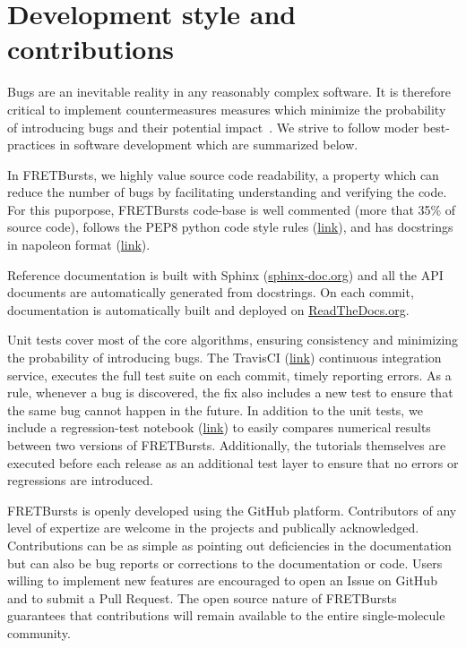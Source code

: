 \section{Development style and contributions}

Bugs are an inevitable reality in any reasonably complex software. It is 
therefore critical to implement countermeasures measures which
minimize the probability of introducing bugs and their potential impact~\cite{Prli__2012, Wilson_2014}.
We strive to follow moder best-practices in software development which are summarized 
below.

In FRETBursts, we highly value source code readability, a property which can 
reduce the number of bugs by facilitating understanding and verifying the code.
For this puporpose, FRETBursts code-base is well commented (more that 35\%
of source code), 
follows the PEP8 python code style rules (\href{https://www.python.org/dev/peps/pep-0008/}{link}),
and has docstrings in napoleon format (\href{http://sphinxcontrib-napoleon.readthedocs.org/}{link}).

Reference documentation is built with Sphinx (\href{http://sphinx-doc.org/}{sphinx-doc.org})
and all the API documents are automatically generated from docstrings.
On each commit, documentation is automatically built and deployed on
\href{https://readthedocs.org/}{ReadTheDocs.org}.

Unit tests cover most of the core algorithms, ensuring consistency and
minimizing the probability of introducing bugs. 
The TravisCI (\href{http://travis-ci.org}{link}) continuous integration service, 
executes the full test suite on each commit, timely reporting errors.
As a rule, whenever a bug is discovered, the  fix also includes a new test
to ensure that the same bug cannot happen in the future.
In addition to the unit tests, we include a regression-test notebook
(\href{https://github.com/tritemio/FRETBursts/blob/master/notebooks/dev/tests/FRETBursts\%20-\%20Regression\%20tests.ipynb}{link})
to easily compares numerical results between two versions of FRETBursts. 
Additionally, the tutorials themselves are executed before each release as
an additional test layer to ensure that no errors or regressions are introduced.

FRETBursts is openly developed using the GitHub platform.
Contributors of any level of expertize are welcome in the projects
and publically acknowledged.
Contributions can be as simple as pointing out deficiencies in the 
documentation but can also be bug reports or corrections to 
the documentation or code. Users willing to implement
new features are encouraged to open an Issue on GitHub and to submit
a Pull Request. The open source nature of FRETBursts guarantees that
contributions will remain available to the entire single-molecule 
community.

